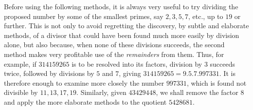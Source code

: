 Before using the following methods, it is always very useful to try dividing the proposed number by some of the smallest primes, say \(2,\allowbreak 3,\allowbreak 5,\allowbreak 7\), etc., up to \(19\) or further. This is not only to avoid regretting the discovery, by subtle and elaborate methods, of a divisor that could have been found much more easily by division alone, but also because, when none of these divisions succeeds, the second method makes very profitable use of the \textit{remainders} from them. Thus, for example, if \(314159265\) is to be resolved into its factors, division by \(3\) succeeds twice, followed by divisions by \(5\) and \(7\), giving \(314159265=9.5.7.997331\). It is therefore enough to examine more closely the number \(997331\), which is found not divisible by \(11,\allowbreak 13,\allowbreak 17,\allowbreak 19\). Similarly, given \(43429448\), we shall remove the factor \(8\) and apply the more elaborate methods to the quotient \(5428681\).


